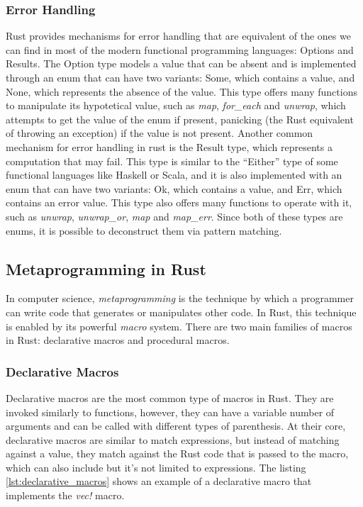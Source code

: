 \subsubsection{Error Handling}
Rust provides mechanisms for error handling that are equivalent of the ones we can find in most of the modern functional programming languages: Options and Results.
The Option type models a value that can be absent and is implemented through an enum that can have two variants: Some, which contains a value, and None, which represents the absence of the value.
This type offers many functions to manipulate its hypotetical value, such as \textit{map}, \textit{for\_each} and \textit{unwrap}, which attempts to get the value of the enum if present, panicking (the Rust
equivalent of throwing an exception) if the value is not present.
Another common mechanism for error handling in rust is the Result type, which represents a computation that may fail. This type is similar to the ``Either'' type of some functional languages like Haskell or Scala,
and it is also implemented with an enum that can have two variants: Ok, which contains a value, and Err, which contains an error value. This type also offers many functions to operate with it, such as
\textit{unwrap}, \textit{unwrap\_or}, \textit{map} and \textit{map\_err}.
Since both of these types are enums, it is possible to deconstruct them via pattern matching.

\subsection{Metaprogramming in Rust}
In computer science, \textit{metaprogramming} is the technique by which a programmer can write code that generates or manipulates other code. In Rust, this technique is enabled
by its powerful \textit{macro} system. There are two main families of macros in Rust: declarative macros and procedural macros.

\subsubsection{Declarative Macros}
Declarative macros are the most common type of macros in Rust. They are invoked similarly to functions, however, they can have a variable number of arguments and can be called with different types of parenthesis.
At their core, declarative macros are similar to match expressions, but instead of matching against a value, they match against the Rust code that is passed to the macro, which can also include but it's not limited to expressions.
The listing \ref{lst:declarative_macros} shows an example of a declarative macro that implements the \textit{vec!} macro.


